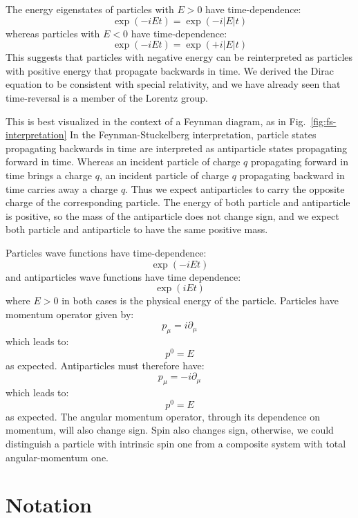 \documentclass[12pt]{article}
\begin{document}
The energy eigenstates of particles with $E > 0$ have time-dependence:
$$\exp(-iEt) = \exp(-i|E|t) $$
whereas particles with $E < 0$ have time-dependence:
$$\exp(-iEt) = \exp(+i|E|t) $$ This suggests that
particles with negative energy can be reinterpreted as particles with
positive energy that propagate backwards in time.  We derived the
Dirac equation to be consistent with special relativity, and we have
already seen that time-reversal is a member of the Lorentz group.

This is best visualized in the context of a Feynman diagram, as in
Fig.~\ref{fig:fs-interpretation} In the Feynman-Stuckelberg
interpretation, particle states propagating backwards in time are
interpreted as antiparticle states propagating forward in time.
Whereas an incident particle of charge $q$ propagating forward in time
brings a charge $q$, an incident particle of charge $q$ propagating
backward in time carries away a charge $q$.  Thus we expect
antiparticles to carry the opposite charge of the corresponding
particle.  The energy of both particle and antiparticle is positive,
so the mass of the antiparticle does not change sign, and we expect
both particle and antiparticle to have the same positive mass.

Particles wave functions have time-dependence:
$$\exp(-iEt)$$
and antiparticles wave functions have time dependence:
$$\exp(iEt)$$
where $E>0$ in both cases is the physical energy of the particle.
Particles have momentum operator given by:
$$p_\mu = i \partial_\mu$$
which leads to:
$$p^0 = E$$
as expected.  Antiparticles must therefore have:
$$p_\mu = -i \partial_\mu$$
which leads to:
$$p^0 = E$$ as expected.  The angular momentum operator, through its
dependence on momentum, will also change sign.  Spin also changes
sign, otherwise, we could distinguish a particle with intrinsic spin
one from a composite system with total angular-momentum one.


\section{Notation}
\end{document}

